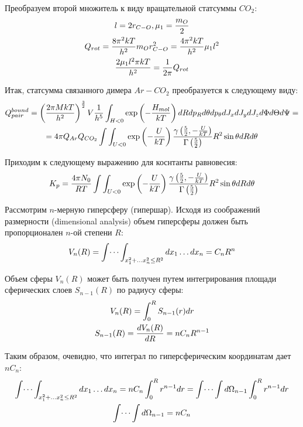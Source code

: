 \documentclass[14pt]{article}
\newcommand{\lb}{\left(}
\newcommand{\rb}{\right)}
\begin{document}
Преобразуем второй множитель к виду вращательной статсуммы $CO_2$:
\begin{gather}
	l = 2 r_{C-O}, \mu_1 = \frac{m_O}{2} \notag \\
	Q_{rot} = \frac{8 \pi^2 k T}{h^2} m_O r_{C-O}^2 = \frac{4 \pi^2 k T}{h^2} \mu_1 l^2 \notag \\
	\frac{2 \mu_1 l^2 \pi k T}{h^2} =  \frac{1}{2 \pi} Q_{rot} \notag 
\end{gather}

Итак, статсумма связанного димера $Ar-CO_2$ преобразуется к следующему виду:
\begin{gather}
	Q^{bound}_{pair} = \lb \frac{2 \pi M k T}{h^2} \rb^\frac{3}{2} V \frac{1}{h^5} \int_{H < 0} \exp \lb - \frac{H_{mol}}{kT} \rb dR dp_R d\theta dp_\theta dJ_x dJ_y dJ_z d \Phi d\Theta d\Psi = \notag \\ 
	= 4 \pi Q_{Ar} Q_{CO_2} \int \int_{U < 0} \exp \lb -\frac{U}{kT}\rb \frac{\gamma \lb \frac{5}{2}, - \frac{U}{kT} \rb}{\Gamma \lb \frac{5}{2} \rb} R^2 \sin \theta dR d\theta \notag
\end{gather}

Приходим к следующему выражению для коснтанты равновесия:
\begin{gather}
	K_p = \frac{4 \pi N_0}{R T} \int \int_{U < 0} \exp \lb -\frac{U}{kT}\rb \frac{\gamma \lb \frac{5}{2}, - \frac{U}{kT} \rb}{\Gamma \lb \frac{5}{2} \rb} R^2 \sin \theta dR d\theta \notag 
\end{gather}

\newpage

Рассмотрим $n$-мерную гиперсферу (гипершар). Исходя из соображений размерности (dimensional analysis) объем гиперсферы должен быть пропорционален $n$-ой степени $R$:
\begin{gather}
	V_n (R) = \int \dots \int_{x_1^2 + \dots x_n^2 \leq R^2} dx_1 \dots dx_n = C_n R^n \notag
\end{gather}

Объем сферы $V_n(R)$ может быть получен путем интегрирования площади сферических слоев $S_{n-1}(R)$ по радиусу сферы:
\begin{gather}
	V_n(R) = \int_{0}^{R} S_{n-1}(r) dr \notag \\
	S_{n-1}(R) = \frac{d V_n(R)}{dR} = nC_n R^{n-1} \notag 
\end{gather}

Таким образом, очевидно, что интеграл по гиперсферическим координатам дает $nC_n$:
\begin{gather}
	\int \dots \int_{x_1^2 + \dots x_n^2 \leq R^2} dx_1 \dots dx_n = n C_n \int_{0}^{R} r^{n-1} dr = \int \dots \int d \Omega_{n-1} \int_{0}^{R} r^{n-1} dr \notag \\
	\int \dots \int d \Omega_{n-1} = n C_n \notag
\end{gather}
\end{document}
